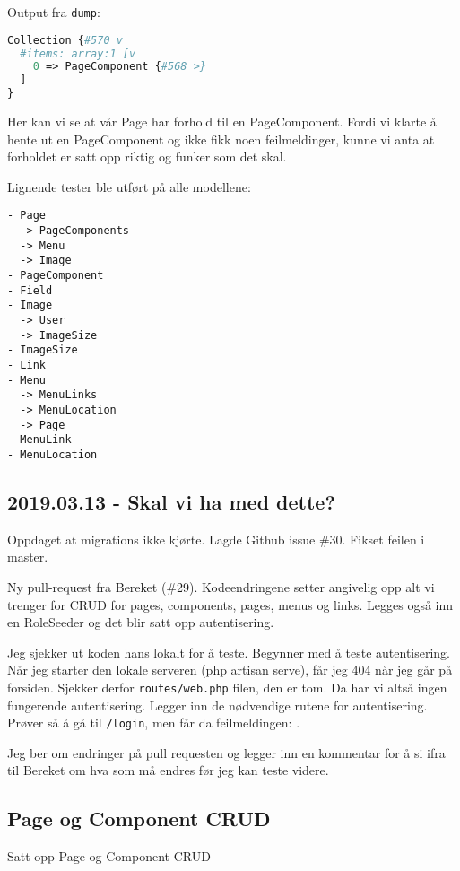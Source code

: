 Output fra \lstinline[language=PHP]{dump}:

\begin{lstlisting}[language=PHP]
Collection {#570 v
  #items: array:1 [v
    0 => PageComponent {#568 >}
  ]
}
\end{lstlisting}

Her kan vi se at vår Page har forhold til en PageComponent. Fordi vi klarte å hente ut en PageComponent og ikke fikk noen feilmeldinger, kunne vi anta at forholdet er satt opp riktig og funker som det skal.

Lignende tester ble utført på alle modellene:

\begin{lstlisting}
- Page
  -> PageComponents
  -> Menu
  -> Image
- PageComponent
- Field
- Image
  -> User
  -> ImageSize
- ImageSize
- Link
- Menu
  -> MenuLinks
  -> MenuLocation
  -> Page
- MenuLink
- MenuLocation
\end{lstlisting}


\subsection{2019.03.13 - Skal vi ha med dette?}

Oppdaget at migrations ikke kjørte. Lagde Github issue \#30. Fikset feilen i master.

Ny pull-request fra Bereket (\#29).
Kodeendringene setter angivelig opp alt vi trenger for CRUD for pages, components, pages, menus og links.
Legges også inn en RoleSeeder og det blir satt opp autentisering.

Jeg sjekker ut koden hans lokalt for å teste.
Begynner med å teste autentisering. Når jeg starter den lokale serveren (php artisan serve), får jeg 404 når
jeg går på forsiden. Sjekker derfor \lstinline{routes/web.php} filen, den er tom. Da har vi altså ingen fungerende autentisering.
Legger inn de nødvendige rutene for autentisering. Prøver så å gå til \lstinline{/login}, men får da feilmeldingen: .

Jeg ber om endringer på pull requesten og legger inn en kommentar for å si ifra til Bereket om hva som må endres før jeg kan teste videre.


\subsection{Page og Component CRUD}

Satt opp Page og Component CRUD


\clearpage